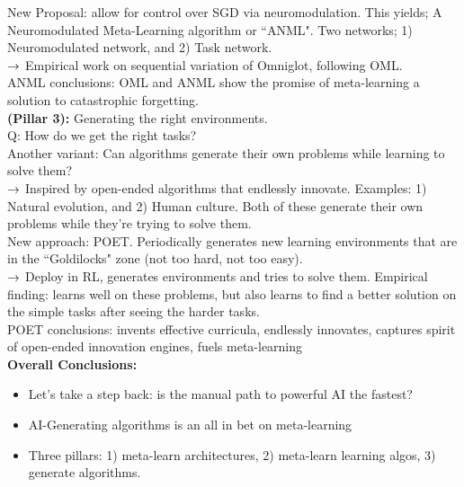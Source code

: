 New Proposal: allow for control over SGD via neuromodulation. This yields; A Neuromodulated Meta-Learning algorithm or ``ANML". Two networks; 1) Neuromodulated network, and 2) Task network. \\

$\rightarrow$ Empirical work on sequential variation of Omniglot, following OML. \\

ANML conclusions: OML and ANML show the promise of meta-learning a solution to catastrophic forgetting. \\

{\bf (Pillar 3):} Generating the right environments. \\

Q: How do we get the right tasks? \\

Another variant: Can algorithms generate their own problems while learning to solve them? \\

$\rightarrow$ Inspired by open-ended algorithms that endlessly innovate. Examples: 1) Natural evolution, and 2) Human culture. Both of these generate their own problems while they're trying to solve them. \\

New approach: POET. Periodically generates new learning environments that are in the ``Goldilocks" zone (not too hard, not too easy). \\

$\rightarrow$ Deploy in RL, generates environments and tries to solve them. Empirical finding: learns well on these problems, but also learns to find a better solution on the simple tasks after seeing the harder tasks. \\

POET conclusions: invents effective curricula, endlessly innovates, captures spirit of open-ended innovation engines, fuels meta-learning \\

{\bf Overall Conclusions:}
\begin{itemize}
    \item Let's take a step back: is the manual path to powerful AI the fastest?
    \item AI-Generating algorithms is an all in bet on meta-learning
    \item Three pillars: 1) meta-learn architectures, 2) meta-learn learning algos, 3) generate algorithms.
\end{itemize}

